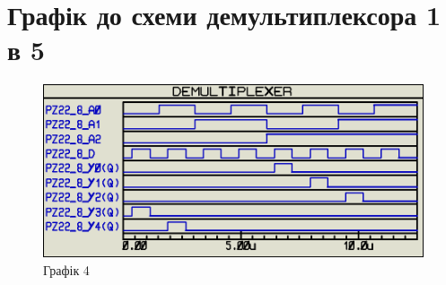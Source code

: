 \documentclass{article}
\begin{document}
\begin{normalsize}
\begin{figure}[H]
		\hspace{5px}
	\end{figure}	

	\section*{Графік до схеми демультиплексора 1 в 5}
	\begin{figure}[H]
		\centering
		\includegraphics[scale=0.5]{g4}	
		\caption{Графік 4}
	\end{figure}


\end{normalsize}
\end{document}
